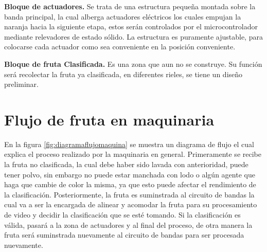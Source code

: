 \documentclass[twoside,spanish,ESP,MSc]{plantillaLabUPV}
\theoremstyle{definition}
\begin{document}

\checkmark\textbf{Bloque de actuadores.} Se trata de una estructura pequeña montada sobre la banda principal, la cual alberga actuadores eléctricos los cuales empujan la naranja hacia la siguiente etapa, estos serán controlados por el microcontrolador mediante relevadores de estado sólido. La estructura es puramente ajustable, para colocarse cada actuador como sea conveniente en la posición conveniente.



\checkmark\textbf{Bloque de fruta Clasificada.} Es una zona que aun no se construye. Su función será recolectar la fruta ya clasificada, en diferentes rieles, se tiene un diseño preliminar.




\section{Flujo de fruta en maquinaria}

En la figura \ref{fig:diagramaflujomaquina} se muestra un diagrama de flujo el cual explica el proceso realizado por la maquinaria en general. Primeramente se recibe la fruta no clasificada, la cual debe haber sido lavada con anterioridad, puede tener polvo, sin embargo no puede estar manchada con lodo o algún agente que haga que cambie de color la misma, ya que esto puede afectar el rendimiento de la clasificación. Posteriormente, la fruta es suminstrada al circuito de bandas la cual va a ser la encargada de alinear y acomodar la fruta para su procesamiento de video y decidir la clasificación que se esté tomando. Si la clasificación es válida, pasará a la zona de actuadores y al final del proceso, de otra manera la fruta será suminstrada nuevamente al circuito de bandas para ser procesada nuevamente.
\end{document}
